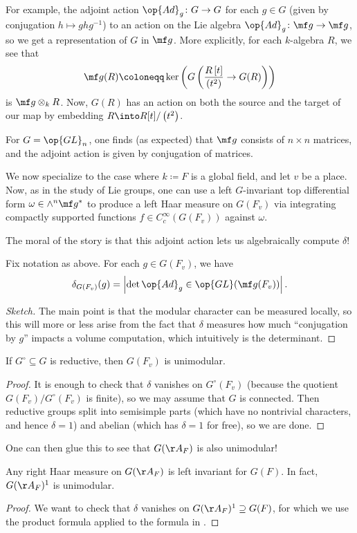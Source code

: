 \documentclass{article}
\begin{document}
For example, the adjoint action $\op{Ad}_g\colon G\to G$ for each $g\in G$ (given by conjugation $h\mapsto ghg^{-1}$) to an action on the Lie algebra $\op{Ad}_g\colon\mf g\to\mf g$, so we get a representation of $G$ in $\mf g$. More explicitly, for each $k$-algebra $R$, we see that
\[\mf g(R)\coloneqq\ker\left(G\left(\frac{R\left[t\right]}{\left(t^2\right)}\to G(R)\right)\right)\]
is $\mf g\otimes_kR$. Now, $G(R)$ has an action on both the source and the target of our map by embedding $R\into R[t]/\left(t^2\right)$.
\begin{example}
	For $G=\op{GL}_n$, one finds (as expected) that $\mf g$ consists of $n\times n$ matrices, and the adjoint action is given by conjugation of matrices.
\end{example}
We now specialize to the case where $k\coloneqq F$ is a global field, and let $v$ be a place. Now, as in the study of Lie groups, one can use a left $G$-invariant top differential form $\omega\in\land^n\mf g^*$ to produce a left Haar measure on $G(F_v)$ via integrating compactly supported functions $f\in C_c^\infty(G(F_v))$ against $\omega$.

The moral of the story is that this adjoint action lets us algebraically compute $\delta$!
\begin{proposition} \label{prop:delta-by-adjoint}
	Fix notation as above. For each $g\in G(F_v)$, we have
	\[\delta_{G(F_v)}(g)=\left|\det{\op{Ad}_{g}}\in\op{GL}(\mf g(F_v))\right|.\]
\end{proposition}
\begin{proof}[Sketch]
	The main point is that the modular character can be measured locally, so this will more or less arise from the fact that $\delta$ measures how much ``conjugation by $g$'' impacts a volume computation, which intuitively is the determinant.
\end{proof}
\begin{corollary}
	If $G^\circ\subseteq G$ is reductive, then $G(F_v)$ is unimodular.
\end{corollary}
\begin{proof}
	It is enough to check that $\delta$ vanishes on $G^\circ(F_v)$ (because the quotient $G(F_v)/G^\circ(F_v)$ is finite), so we may assume that $G$ is connected. Then reductive groups split into semisimple parts (which have no nontrivial characters, and hence $\delta=1$) and abelian (which has $\delta=1$ for free), so we are done.
\end{proof}
One can then glue this to see that $G(\AA_F)$ is also unimodular!
\begin{corollary}
	Any right Haar measure on $G(\AA_F)$ is left invariant for $G(F)$. In fact, $G(\AA_F)^1$ is unimodular.
\end{corollary}
\begin{proof}
	We want to check that $\delta$ vanishes on $G(\AA_F)^1\supseteq G(F)$, for which we use the product formula applied to the formula in .
\end{proof}
\end{document}
